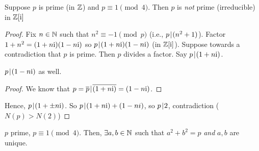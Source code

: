 \documentclass[notes.tex]{subfiles}
\begin{document}
\begin{digression}
	\begin{proposition}
		Suppose $p$ is prime (in $\mathbb{Z}$) and $p\equiv 1\pmod 4$. Then $p$ is \emph{not} prime (irreducible) in $\mathbb{Z}[\mathrm{i}]$
	\end{proposition}
	\begin{proof}
		Fix $n\in\mathbb{N}$ such that $n^2 \equiv -1\pmod p$ (i.e., $p\mkern2mu|\mkern1mu (n^2 + 1)$). Factor $1+n^2 = (1+n\mathrm{i})(1-n\mathrm{i}) $ so $p\mkern2mu|\mkern1mu (1+n\mathrm{i})(1-n\mathrm{i})$ (in $\mathbb{Z}[\mathrm{i}]$).
		Suppose towards a contradiction that $p$ is prime. Then $p$ divides a factor. Say $p\mkern2mu|\mkern1mu(1+n\mathrm{i})$.
		\begin{claim}
			$p\mkern2mu|\mkern1mu (1-n\mathrm{i})$ as well.
		\end{claim}
		\begin{proof}
			We know that $p = \overline{p} \mkern2mu|\mkern1mu \overline{(1+n\mathrm{i})} = (1-n\mathrm{i})$. 
		\end{proof}

		Hence, $p\mkern2mu|\mkern1mu (1+\pm n\mathrm{i})$. So $p\mkern2mu|\mkern1mu (1+n\mathrm{i}) + (1-ni)$, so $p\mkern2mu|\mkern1mu 2$, contradiction ($N(p) > N(2)$)
	\end{proof}

	\begin{theorem}[Fermat]
		$p$ prime, $p\equiv 1\pmod 4$. Then, $\exists a, b\in\mathbb{N}$ such that $a^2 + b^2 = p$ \emph{and} $a, b$ are unique.	
	\end{theorem}
\end{digression}
\end{document}
